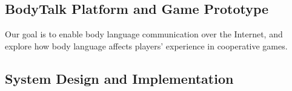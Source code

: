 




\subsection{BodyTalk Platform and Game Prototype}


Our goal is to enable body language communication over the Internet, and explore how body language affects players' experience in cooperative games. 

\subsection{System Design and Implementation}

